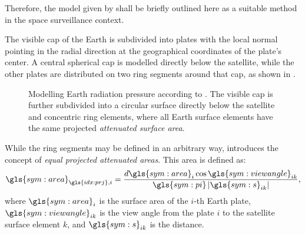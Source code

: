 Therefore, the model given by \cite{knocke1989} shall be briefly outlined here as a suitable method in the space surveillance context.

The visible cap of the Earth is subdivided into plates with the local normal pointing in the radial direction at the geographical coordinates of the plate's center. A central 
spherical cap is modelled directly below the satellite, while the other plates are distributed on two ring segments around that cap, as shown in .
\begin{figure}[t!]
  \centering
  \quad
  \caption{Modelling Earth radiation pressure according to \cite{knocke1989}. 
           The visible cap is further subdivided into a circular surface directly below the satellite and concentric ring elements, where all Earth surface elements 
           have the same projected \textit{attenuated surface area}.\label{fig:earth-cap-albedo}}
\end{figure}
While the ring segments may be defined in an arbitrary way, \cite{knocke1989} introduces the concept of \textit{equal projected attenuated areas}. This area is defined as:
\begin{equation}
  \gls{sym:area}_{\gls{idx:prj},i} = \frac{d\gls{sym:area}_i\cos \gls{sym:viewangle}_{ik}}{\gls{sym:pi}\left|\gls{sym:s}_{ik}\right|}, \label{eq:albedo-attenuation}
\end{equation}
where $\gls{sym:area}_i$ is the surface area of the $i$-th Earth plate, $\gls{sym:viewangle}_{ik}$ is the view angle from the plate $i$ to the satellite 
surface element $k$, and $\gls{sym:s}_{ik}$ is the distance. 

